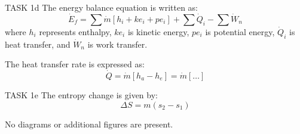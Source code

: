 TASK 1d  
The energy balance equation is written as:  
\[
\dot{E}_f = \sum \dot{m} \left[ h_i + ke_i + pe_i \right] + \sum \dot{Q}_i - \sum \dot{W}_n
\]  
where \( h_i \) represents enthalpy, \( ke_i \) is kinetic energy, \( pe_i \) is potential energy, \( \dot{Q}_i \) is heat transfer, and \( \dot{W}_n \) is work transfer.  

The heat transfer rate is expressed as:  
\[
\dot{Q} = \dot{m} \left[ h_a - h_e \right] = \dot{m} \left[ \ldots \right]
\]  

TASK 1e  
The entropy change is given by:  
\[
\Delta S = m \left( s_2 - s_1 \right)
\]  

No diagrams or additional figures are present.